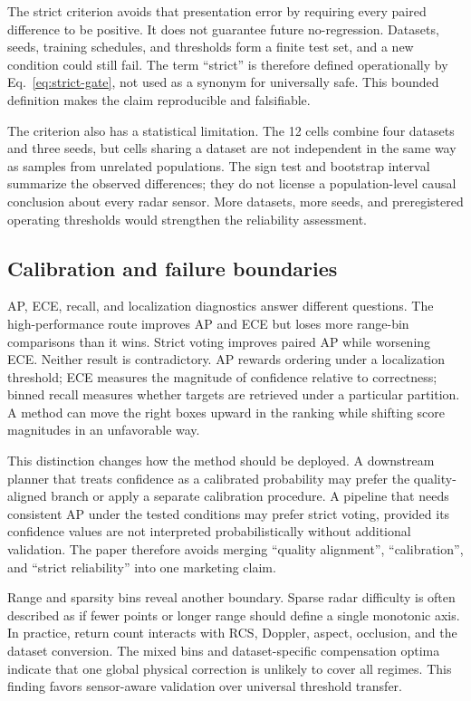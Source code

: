 \documentclass[final,5p,times]{elsarticle}
\begin{document}
The strict criterion avoids that presentation error by requiring every paired
difference to be positive. It does not guarantee future no-regression.
Datasets, seeds, training schedules, and thresholds form a finite test set,
and a new condition could still fail. The term ``strict'' is therefore defined
operationally by Eq.~\eqref{eq:strict-gate}, not used as a synonym for
universally safe. This bounded definition makes the claim reproducible and
falsifiable.

The criterion also has a statistical limitation. The 12 cells combine four
datasets and three seeds, but cells sharing a dataset are not independent in
the same way as samples from unrelated populations. The sign test and
bootstrap interval summarize the observed differences; they do not license a
population-level causal conclusion about every radar sensor. More datasets,
more seeds, and preregistered operating thresholds would strengthen the
reliability assessment.

\subsection{Calibration and failure boundaries}

AP, ECE, recall, and localization diagnostics answer different questions. The
high-performance route improves AP and ECE but loses more range-bin comparisons
than it wins. Strict voting improves paired AP while worsening ECE. Neither
result is contradictory. AP rewards ordering under a localization threshold;
ECE measures the magnitude of confidence relative to correctness; binned
recall measures whether targets are retrieved under a particular partition.
A method can move the right boxes upward in the ranking while shifting score
magnitudes in an unfavorable way.

This distinction changes how the method should be deployed. A downstream
planner that treats confidence as a calibrated probability may prefer the
quality-aligned branch or apply a separate calibration procedure. A pipeline
that needs consistent AP under the tested conditions may prefer strict voting,
provided its confidence values are not interpreted probabilistically without
additional validation. The paper therefore avoids merging ``quality
alignment'', ``calibration'', and ``strict reliability'' into one marketing
claim.

Range and sparsity bins reveal another boundary. Sparse radar difficulty is
often described as if fewer points or longer range should define a single
monotonic axis. In practice, return count interacts with RCS, Doppler, aspect,
occlusion, and the dataset conversion. The mixed bins and dataset-specific
compensation optima indicate that one global physical correction is unlikely
to cover all regimes. This finding favors sensor-aware validation over
universal threshold transfer.
\end{document}
